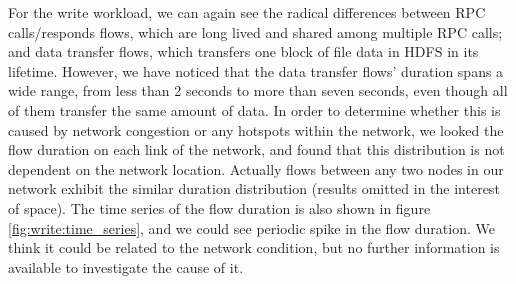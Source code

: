 For the write workload, we can again see the radical differences between RPC calls/responds flows, which are long lived and shared among multiple RPC calls; and data transfer flows, which transfers one block of file data in HDFS in its lifetime. However, we have noticed that the data transfer flows' duration spans a wide range, from less than 2 seconds to more than seven seconds, even though all of them transfer the same amount of data. In order to determine whether this is caused by network congestion or any hotspots within the network, we looked the flow duration on each link of the network, and found that this distribution is not dependent on the network location. Actually flows between any two nodes in our network exhibit the similar duration distribution (results omitted in the interest of space). The time series of the flow duration is also shown in figure \ref{fig:write:time_series}, and we could see periodic spike in the flow duration. We think it could be related to the network condition, but no further information is available to investigate the cause of it.

